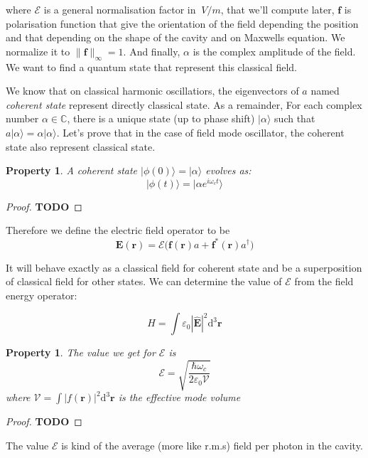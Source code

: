 \documentclass[10pt]{report}
\theoremstyle{plain}
\newtheorem{prop}[thm]{Property}
\theoremstyle{definition}
\theoremstyle{remark}
\newcommand{\C}{\ensuremath{\mathbb{C}}}
\newcommand{\TODO}{\textbf{TODO}}
\newcommand{\ket}[1]{|#1\rangle}
\newcommand{\dd}{\mathrm{d}}
\newcommand{\bs}{\boldsymbol}
\begin{document}
where $\mathcal{E}$ is a general normalisation factor in $\SI{}{V/m}$, that
we'll compute later, $\bs f$
is polarisation function that give the orientation of the field depending the
position and that depending on the shape of the cavity and on Maxwells equation.
We normalize it to $\|\bs f\|_\infty = 1$. And finally, $\alpha$ is the complex amplitude
of the field. We want to find a quantum state that represent this classical
field.

We know that on classical harmonic oscillatiors, the eigenvectors of $a$ named
\emph{coherent state} represent directly classical state. As a remainder, For
each complex number $\alpha \in \C$, there is a unique state (up to phase shift)
$\ket \alpha$ such that $a \ket \alpha = \alpha \ket \alpha$.
Let's prove that in the case of field mode oscillator, the coherent state also
represent classical state.

\begin{prop}
  A coherent state $\ket{\phi(0)} = \ket \alpha$ evolves as:
  \[ \ket {\phi(t)} = \ket {\alpha e^{i\omega_c t}} \]
\end{prop}

\begin{proof}\TODO{}
\end{proof}

Therefore we define the electric field operator to be
\begin{equation}\label{eqn:Eop}
\bs E(\bs r) = \mathcal{E}\big(\bs f(\bs r) a + \bs f^*(\bs r)
  a^\dagger \big)
\end{equation}

It will behave exactly as a classical field for coherent state and be a
superposition of classical field for other states. We can determine the value of
$\mathcal{E}$ from the field energy operator:

\[ H = \int \varepsilon_0 |\hat {\bs E}|^2 \dd^3 \bs r \]

\begin{prop}
  The value we get for $\mathcal{E}$ is
\[ \mathcal{E} = \sqrt{\frac{\hbar \omega_c}{2 \varepsilon_0 \mathcal{V}}}\]
where $\mathcal{V} = \int \bs |f(\bs r)|^2\dd^3\bs r$ is the effective mode volume
\end{prop}

\begin{proof} \TODO{}
\end{proof}

The value $\mathcal{E}$ is kind of the average (more like r.m.s) field per
photon in the cavity.
\end{document}
